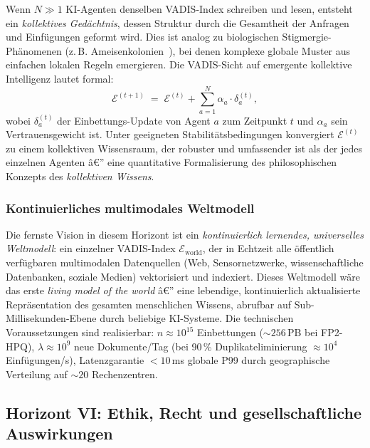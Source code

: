 ﻿\documentclass[12pt,a4paper]{article}
\begin{document}
Wenn $N \gg 1$ KI-Agenten denselben VADIS-Index
schreiben und lesen, entsteht ein \emph{kollektives
Gedächtnis}, dessen Struktur durch die Gesamtheit
der Anfragen und Einfügungen geformt wird.
Dies ist analog zu biologischen Stigmergie-Phänomenen
(z.\,B. Ameisenkolonien~\cite{dorigo1999ant}), bei denen
komplexe globale Muster aus einfachen lokalen Regeln emergieren.
Die VADIS-Sicht auf emergente kollektive Intelligenz
lautet formal:
\begin{equation}
  \mathcal{E}^{(t+1)} \;=\; \mathcal{E}^{(t)}
    + \sum_{a=1}^N \alpha_a \cdot \delta_a^{(t)},
\end{equation}
wobei $\delta_a^{(t)}$ der Einbettungs-Update von Agent
$a$ zum Zeitpunkt $t$ und $\alpha_a$ sein Vertrauens\-gewicht
ist. Unter geeigneten Stabilitätsbedingungen konvergiert
$\mathcal{E}^{(t)}$ zu einem kollektiven Wissensraum,
der robuster und umfassender ist als der jedes
einzelnen Agenten â€” eine quantitative Formalisierung des
philosophischen Konzepts des \emph{kollektiven Wissens}.

\subsubsection{Kontinuierliches multimodales Weltmodell}

Die fernste Vision in diesem Horizont ist ein
\emph{kontinuierlich lernendes, universelles Weltmodell}:
ein einzelner VADIS-Index $\mathcal{E}_{\text{world}}$,
der in Echtzeit alle öffentlich verfügbaren multimodalen
Datenquellen (Web, Sensornetzwerke, wissenschaftliche
Datenbanken, soziale Medien) vektorisiert und
indexiert. Dieses Weltmodell wäre das erste
\emph{living model of the world} â€” eine lebendige,
kontinuierlich aktualisierte Repräsentation des
gesamten menschlichen Wissens, abrufbar auf
Sub-Millisekunden-Ebene durch beliebige KI-Systeme.
Die technischen Voraussetzungen sind realisierbar:
$n \approx 10^{15}$ Einbettungen ($\sim 256$\,PB bei FP2-HPQ),
$\lambda \approx 10^9$ neue Dokumente/Tag (bei 90\,\%
Duplikateliminierung $\approx 10^4$ Einfügungen/s),
Latenzgarantie $< 10$\,ms globale P99 durch geographische
Verteilung auf $\sim 20$ Rechenzentren.

\subsection{Horizont VI: Ethik, Recht und gesellschaftliche
            Auswirkungen}
\label{sub:horizont6}
\end{document}
